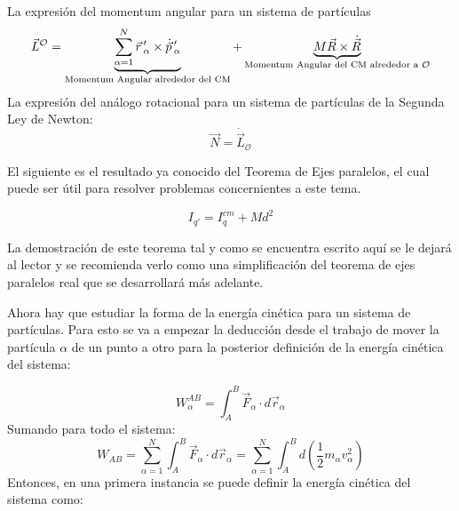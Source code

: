 \documentclass[/home/hernan-barquero/Documents/Apuntes_mecanica_teorica/main.tex]{subfiles}
\begin{document}
	\begin{definition}
		La expresión del momentum angular para un sistema de partículas
		\begin{equation}
			\vec{L}^{\mathcal{O}} = \underbrace{\sum_{\alpha =1}^{N} {\vec{r}}\,'_{\alpha} \times {\dot{\vec{p}}}\,'_{\alpha}}_{\textup{Momentum Angular alrededor del CM}} + \underbrace{M \vec{R} \times \dot{\vec{R}}}_{\textup{Momentum Angular del CM alrededor a $\mathcal{O}$}}
			\label{eq: sismomentumA}
		\end{equation}
		La expresión del análogo rotacional para un sistema de partículas de la Segunda Ley de Newton:
		\begin{equation}
			\vec{N} = \dot{\vec{L}}_{\mathcal{O}}
			\label{eq: sisNSecondlawrot}
		\end{equation}
	\end{definition}

	El siguiente es el resultado ya conocido del Teorema de Ejes paralelos, el cual puede ser útil para resolver problemas concernientes a este tema.

	\begin{theorem}
		\begin{equation}
			I_{{q}'}= I_{q}^{cm} + Md^{2}
		\end{equation}

		La demostración de este teorema tal y como se encuentra escrito aquí se le dejará al lector y se recomienda verlo como una simplificación del teorema de ejes paralelos real que se desarrollará más adelante.
	\end{theorem}

	Ahora hay que estudiar la forma de la energía cinética para un sistema de partículas. Para esto se va a empezar la deducción desde el trabajo de mover la partícula $\alpha$ de un punto a otro para la posterior definición de la energía cinética del sistema: 

	\begin{equation*}
		W_{\alpha}^{AB} = \int_{A}^{B} \vec{F}_{\alpha} \cdot d\vec{r}_{\alpha}
	\end{equation*}
	Sumando para todo el sistema: 
	\begin{equation*}
		W_{AB} = \sum_{\alpha = 1}^{N} \int_{A}^{B} \vec{F}_{\alpha} \cdot d\vec{r}_{\alpha} = \sum_{\alpha = 1}^{N} \int_{A}^{B} d\left(\frac{1}{2} m_{\alpha}v_{\alpha}^{2}\right)
	\end{equation*}
	Entonces, en una primera instancia se puede definir la energía cinética del sistema como:
\end{document}
